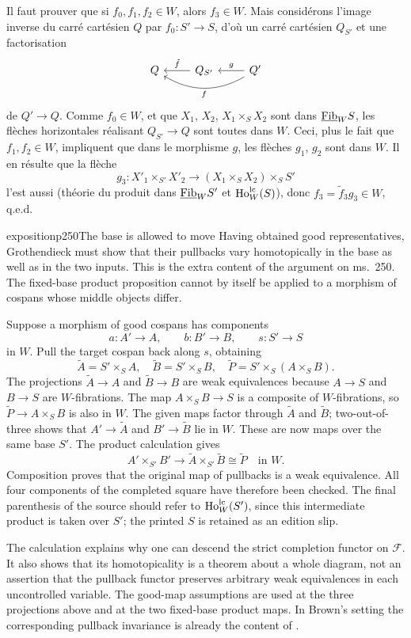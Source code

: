 Il faut prouver que si $f_0,f_1,f_2\in W$, alors $f_3\in W$. Mais considérons l'image inverse du carré cartésien $Q$ par $f_0 : S'\longrightarrow S$, d'où un carré cartésien $Q_{S'}$ et une factorisation
\[
\begin{tikzcd}[ampersand replacement=\&]
Q \& Q_{S'} \arrow[l, "\tilde{f}"'] \& Q' \arrow[l, "g"'] \arrow[ll, bend left, "f"]
\end{tikzcd}
\]
de $Q'\longrightarrow Q$. Comme $f_0\in W$, et que $X_1$, $X_2$, $X_1\times_S X_2$ sont dans $\underline{\mathrm{Fib}}_W S$, les flèches horizontales réalisant $Q_{S'}\longrightarrow Q$ sont toutes dans $W$. Ceci, plus le fait que $f_1,f_2\in W$, impliquent que dans le morphisme $g$, les flèches $g_1$, $g_2$ sont dans $W$. Il en résulte que la flèche
\[
g_3 : X'_1\times_{S'}X'_2\longrightarrow(X_1\times_S X_2)\times_S S'
\]
l'est aussi (théorie du produit dans $\underline{\mathrm{Fib}}_W S'$ et $\mathrm{Ho}^{\mathrm{lc}}_W(S)$), donc $f_3=\tilde{f}_3g_3\in W$, q.e.d.


\begin{dcomment}{exposition}{p250}{The base is allowed to move}
Having obtained good representatives, Grothendieck must show that their pullbacks vary homotopically in the base as well as in the two inputs. This is the extra content of the argument on ms.~250. The fixed-base product proposition cannot by itself be applied to a morphism of cospans whose middle objects differ.

Suppose a morphism of good cospans has components
\[
 a:A'\to A,\qquad b:B'\to B,\qquad s:S'\to S
\]
in $W$. Pull the target cospan back along $s$, obtaining
\[
 \tilde A=S'\times_S A,\quad
 \tilde B=S'\times_S B,\quad
 \tilde P=S'\times_S(A\times_S B).
\]
The projections $\tilde A\to A$ and $\tilde B\to B$ are weak equivalences because $A\to S$ and $B\to S$ are $W$-fibrations. The map $A\times_S B\to S$ is a composite of $W$-fibrations, so $\tilde P\to A\times_S B$ is also in $W$. The given maps factor through $\tilde A$ and $\tilde B$; two-out-of-three shows that $A'\to\tilde A$ and $B'\to\tilde B$ lie in $W$. These are now maps over the same base $S'$. The product calculation gives
\[
 A'\times_{S'}B'\longrightarrow
 \tilde A\times_{S'}\tilde B\cong\tilde P
 \quad\text{in }W.
\]
Composition proves that the original map of pullbacks is a weak equivalence. All four components of the completed square have therefore been checked. The final parenthesis of the source should refer to $\mathrm{Ho}_W^{\mathrm{lc}}(S')$, since this intermediate product is taken over $S'$; the printed $S$ is retained as an edition slip.

The calculation explains why one can descend the strict completion functor on $\mathcal F$. It also shows that its homotopicality is a theorem about a whole diagram, not an assertion that the pullback functor preserves arbitrary weak equivalences in each uncontrolled variable. The good-map assumptions are used at the three projections above and at the two fixed-base product maps. In Brown's setting the corresponding pullback invariance is already the content of \citet[Part~I, \S4, Lemmas~1--2, pp.~428--429]{Brown1973}.
\end{dcomment}


